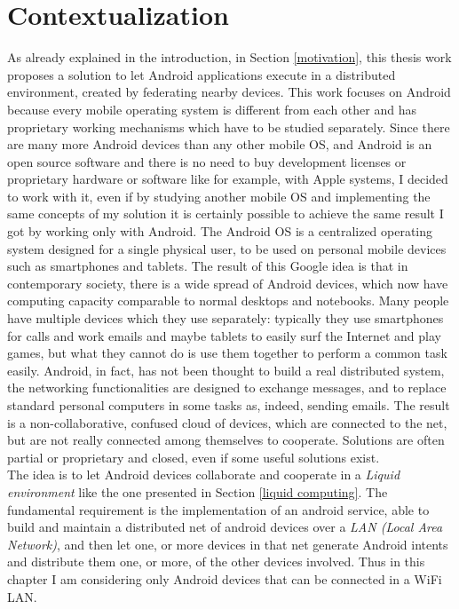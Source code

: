 \section{Contextualization} \label{facedProblem}
As already explained in the introduction, in Section \ref{motivation}, this thesis work proposes a solution to let Android applications execute in a distributed environment, created by federating nearby devices. This work focuses on Android because every mobile operating system is different from each other and has proprietary working mechanisms which have to be studied separately. Since there are many more Android devices than any other mobile OS, and Android is an open source software and there is no need to buy development licenses or proprietary hardware or software like for example, with Apple systems, I decided to work with it, even if by studying another mobile OS and implementing the same concepts of my solution it is certainly possible to achieve the same result I got by working only with Android. 
The Android OS is a centralized operating system designed for a single physical user, to be used on personal mobile devices such as smartphones and tablets. The result of this Google idea is that in contemporary society, there is a wide spread of Android devices, which now have computing capacity comparable to normal desktops and notebooks. Many people have multiple devices which they use separately: typically they use smartphones for calls and work emails and maybe tablets to easily surf the Internet and play games, but what they cannot do is use them together to perform a common task easily. Android, in fact, has not been thought to build a real distributed system, the networking functionalities are designed to exchange messages, and to replace standard personal computers in some tasks as, indeed, sending emails.
The result is a non-collaborative, confused cloud of devices, which are connected to the net, but are not really connected among themselves to cooperate. Solutions are often partial or proprietary and closed, even if some useful solutions exist.\\
The idea is to let Android devices collaborate and cooperate in a \textit{Liquid environment} like the one presented in Section \ref{liquid computing}. The fundamental requirement is the implementation of an android service, able to build and maintain a distributed net of android devices over a \textit{LAN (Local Area Network)}, and then let one, or more devices in that net generate Android intents and distribute them one, or more, of the other devices involved. Thus in this chapter I am considering only Android devices that can be connected in a WiFi LAN.\\
